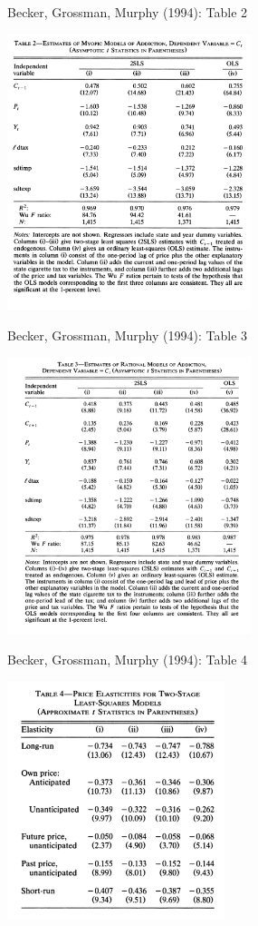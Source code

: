 \documentclass[aspectratio=169]{beamer}
\begin{document}
\begin{frame}{Becker, Grossman, Murphy (1994): Table 2}
\begin{center}
\includegraphics[width=2.8in]{./resources/gbm_t2.png}
\end{center}
\end{frame}

\begin{frame}{Becker, Grossman, Murphy (1994): Table 3}
\begin{center}
\includegraphics[width=2.8in]{./resources/gbm_t3.png}
\end{center}
\end{frame}

\begin{frame}{Becker, Grossman, Murphy (1994): Table 4}
\begin{center}
\includegraphics[width=2.5in]{./resources/gbm_t4.png}
\end{center}
\end{frame}
\end{document}
